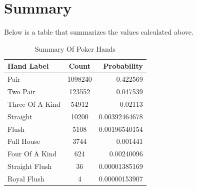 \newpage 
\section*{Summary}
Below is a table that summarizes the values calculated above.
\begin{table}[ht]
    \centering
    \begin{tabular}{|l|c|r|}
    \hline
        \textbf{Hand Label} & \textbf{Count} & \textbf{Probability} \\ \hline \hline
        Pair                &  1098240   & 0.422569\\ \hline
        Two Pair            &  123552      & 0.047539 \\ \hline
        Three Of A Kind     &  54912   &  0.02113\\ \hline
        Straight            & 10200 & 0.00392464678 \\ \hline   
        Flush               & 5108 & 0.00196540154\\ \hline        
        Full House          &  3744  &  0.001441 \\ \hline
        Four Of A Kind      &  624  &  0.00240096\\ \hline
        Straight Flush      &  36 & 0.00001385169\\ \hline
        Royal Flush         &  4 & 0.00000153907 \\ \hline
    \end{tabular}
    \caption{Summary Of Poker Hands}
    \label{tab:my_label}
\end{table}